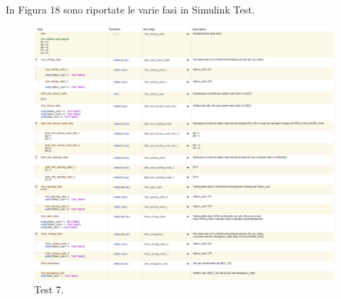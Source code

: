 \documentclass[12pt]{article}
\begin{document}
In Figura 18 sono riportate le varie fasi in Simulink Test.
\begin{figure}[H]
    
    \hspace{-2.3cm} %
    \includegraphics[width=1.3\textwidth]{Immagini_Test/Test_7_img.PNG}
    \caption{Test 7.}
    \label{fig:Test_7}
\end{figure}
\newpage
{}
\listoffigures
\end{document}
